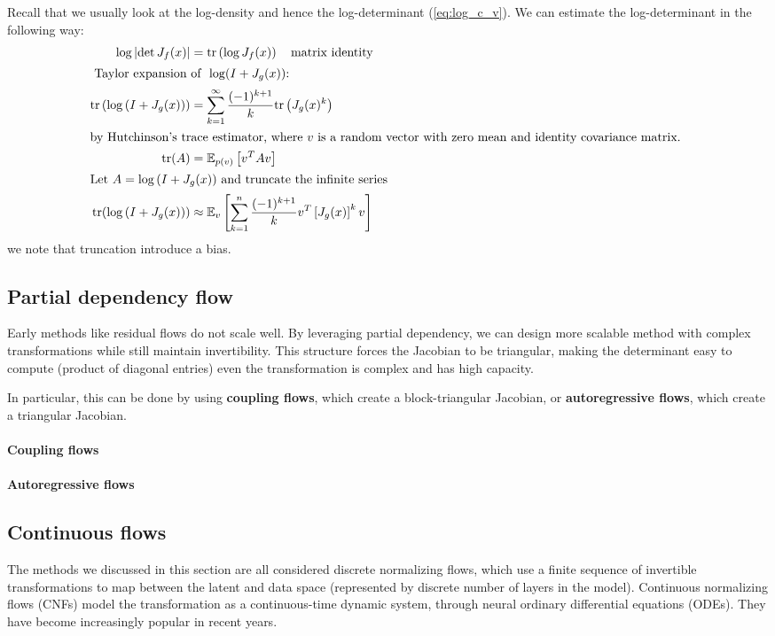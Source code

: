 \documentclass{mytufte-light}
\begin{document}
Recall that we usually look at the log-density and hence the log-determinant
(\cref{eq:log_c_v}). We can estimate the log-determinant in the following way:
\begin{align}
    \log \left| \det J_f(x) \right| &= \text{tr} \left(\log J_f(x) \right) \quad \text{matrix identity}\\
    \intertext{
        {Taylor expansion of } \(\log(I + J_g(x))\):
    }
    \text{tr}\left(\log \left(
        I + J_g(x)
    \right)\right) &= \sum_{k=1}^\infty \dfrac{(-1)^{k+1}}{k} \text{tr}\left(J_g(x)^k\right) \\
    \intertext{by Hutchinson's trace estimator, where \( v \) is a random vector with zero mean and identity covariance matrix.
    }
    \text{tr}(A) &= \mathbb{E}_{p(v)}\left[v^T A v\right] \\
    \intertext{Let \(A = \log \left(
        I + J_g(x)
    \right)\) and truncate the infinite series}
    \text{tr}(\log \left(
        I + J_g(x)
    \right))
    &\approx \mathbb{E}_v\left[\sum_{k=1}^n \dfrac{(-1)^{k+1}}{k} v^T \left[J_g(x)\right]^k v\right]
\end{align}
we note that truncation introduce a bias.

\subsection{Partial dependency flow}
Early methods like residual flows do not scale well.
By leveraging partial dependency,
we can design more scalable method with complex transformations while still maintain invertibility.
This structure forces the Jacobian to be triangular, 
making the determinant easy to compute (product of diagonal entries) even 
the transformation is complex and has high capacity.

In particular, this can be done by using \textbf{coupling flows}, which create a block-triangular Jacobian,
or \textbf{autoregressive flows}, which create a triangular Jacobian.

\paragraph{Coupling flows}



\paragraph{Autoregressive flows}


\subsection{Continuous flows}
The methods we discussed in this section are all 
considered discrete normalizing flows, which 
use a finite sequence of invertible transformations to 
map between the latent and data space (represented 
by discrete number of layers in the model).
Continuous normalizing flows (CNFs) model the transformation as a continuous-time dynamic system,
through neural ordinary differential equations (ODEs). 
They have become increasingly popular in recent years.
\end{document}
